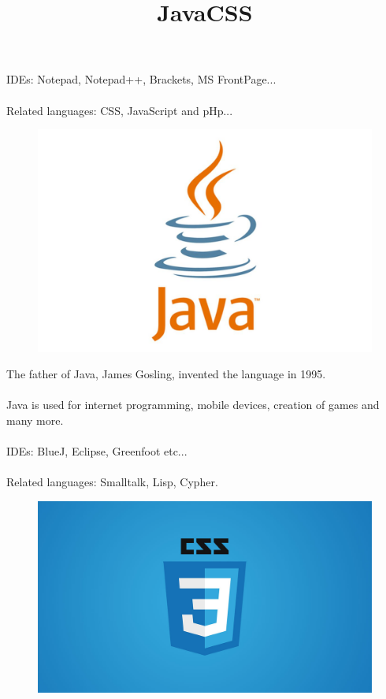 \documentclass{article}
\begin{document}
	\paragraph{}
	IDEs: Notepad, Notepad++, Brackets, MS FrontPage...
	\paragraph{}
	Related languages: CSS, JavaScript and pHp...
	\newpage
	\title{Java}
	\begin{figure}
		\includegraphics[width=\linewidth]{java.jpg}
	\end{figure}
	
	\newpage
	The father of Java, James Gosling, invented the language in 1995.
	\paragraph{}
	Java is used for internet programming, mobile devices, creation of games and many more.
	\paragraph{}
	IDEs: BlueJ, Eclipse, Greenfoot etc...
	\paragraph{}
	Related languages: Smalltalk, Lisp, Cypher.
	
	\newpage
	\title{CSS}
	\begin{figure}
		\includegraphics[width=\linewidth]{CSS.jpg}
	\end{figure}
\end{document}

